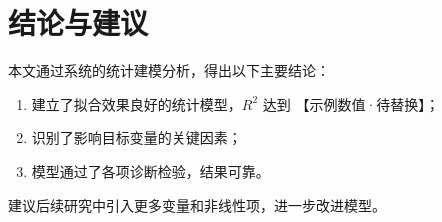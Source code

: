 \section{结论与建议}

本文通过系统的统计建模分析，得出以下主要结论：

\begin{enumerate}
  \item 建立了拟合效果良好的统计模型，$R^2$ 达到 【示例数值·待替换】；
  \item 识别了影响目标变量的关键因素；
  \item 模型通过了各项诊断检验，结果可靠。
\end{enumerate}

建议后续研究中引入更多变量和非线性项，进一步改进模型。
